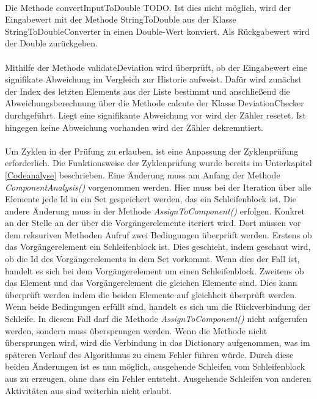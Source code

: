     \\
    Die Methode convertInputToDouble TODO. Ist dies nicht möglich, wird der Eingabewert mit der Methode StringToDouble aus der Klasse StringToDoubleConverter in einen Double-Wert konviert.
    Als Rückgabewert wird der Double zurückgeben.\\
    \\
    Mithilfe der Methode validateDeviation wird überprüft, ob der Eingabewert eine signifikate Abweichung im Vergleich zur Historie aufweist.
    Dafür wird zunächst der Index des letzten Elements aus der Liste bestimmt und anschließend die Abweichungsberechnung über die Methode calcute der Klasse DeviationChecker durchgeführt.
    Liegt eine signifikante Abweichung vor wird der Zähler resetet. Ist hingegen keine Abweichung vorhanden wird der Zähler dekremntiert.\\
    \\
    Um Zyklen in der Prüfung zu erlauben, ist eine Anpassung der Zyklenprüfung erforderlich.
    Die Funktionsweise der Zyklenprüfung wurde bereits im Unterkapitel \ref{Codeanalyse} beschrieben.
    Eine Änderung muss am Anfang der Methode \textit{ComponentAnalysis()} vorgenommen werden.
    Hier muss bei der Iteration über alle Elemente jede Id in ein Set gespeichert werden, das ein Schleifenblock ist.
    Die andere Änderung muss in der Methode \textit{AssignToComponent()} erfolgen.
    Konkret an der Stelle an der über die Vorgängerelemente iteriert wird.
    Dort müssen vor dem reksuriven Methoden Aufruf zwei Bedingungen überprüft werden.
    Erstens ob das Vorgängerelement ein Schleifenblock ist.
    Dies geschieht, indem geschaut wird, ob die Id des Vorgängerelements in dem Set vorkommt. 
    Wenn dies der Fall ist, handelt es sich bei dem Vorgängerelement um einen Schleifenblock.
    Zweitens ob das Element und das Vorgängerelement die gleichen Elemente sind.
    Dies kann überprüft werden indem die beiden Elemente auf gleichheit überprüft werden.
    Wenn beide Bedingungen erfüllt sind, handelt es sich um die Rückverbindung der Schleife. 
    In diesem Fall darf die Methode \textit{AssignToComponent()} nicht aufgerufen werden, sondern muss übersprungen werden.
    Wenn die Methode nicht übersprungen wird, wird die Verbindung in das Dictionary aufgenommen, was im späteren Verlauf des Algorithmus zu einem Fehler führen würde.
    Durch diese beiden Änderungen ist es nun möglich, ausgehende Schleifen vom Schleifenblock aus zu erzeugen, ohne dass ein Fehler entsteht.
    Ausgehende Schleifen von anderen Aktivitäten aus sind weiterhin nicht erlaubt.
